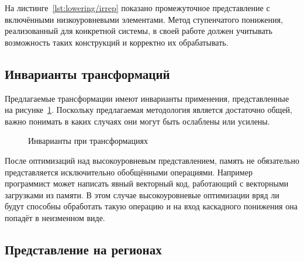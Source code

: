 На листинге~\cref{lst:lowering/irrep} показано промежуточное представление с включёнными низкоуровневыми элементами. Метод ступенчатого понижения, реализованный для конкретной системы, в своей работе должен учитывать возможность таких конструкций и корректно их обрабатывать.

\subsection{Инварианты трансформаций}\label{subsec:lowering/passes/invariants}

Предлагаемые трансформации имеют инварианты применения, представленные на рисунке~\cref{fig:highlevel-mgr-inv}. Поскольку предлагаемая методология является достаточно общей, важно понимать в каких случаях они могут быть ослаблены или усилены.

\begin{figure}[ht]
    \caption{Инварианты при трансформациях}\label{fig:highlevel-mgr-inv}
\end{figure}

После оптимизаций над высокоуровневым представлением, память не обязательно представляется исключительно обобщёнными операциями. Например программист может написать явный векторный код, работающий с векторными загрузками из памяти. В этом случае высокоуровневые оптимизации вряд ли будут способны обработать такую операцию и на вход каскадного понижения она попадёт в неизменном виде.

\subsection{Представление на регионах}\label{subsec:lowering/passes/lowlevel}

